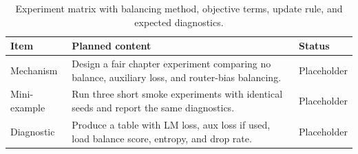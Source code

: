 \begin{table}[H]
\centering
\caption{Experiment matrix with balancing method, objective terms, update rule, and expected diagnostics.}
\label{tab:ch09-comparing-balancing-methods}
\begin{tabularx}{\textwidth}{p{}X p{}}
\toprule
Item & Planned content & Status \\
\midrule
Mechanism & Design a fair chapter experiment comparing no balance, auxiliary loss, and router-bias balancing. & Placeholder \\
Mini-example & Run three short smoke experiments with identical seeds and report the same diagnostics. & Placeholder \\
Diagnostic & Produce a table with LM loss, aux loss if used, load balance score, entropy, and drop rate. & Placeholder \\
\bottomrule
\end{tabularx}
\end{table}
